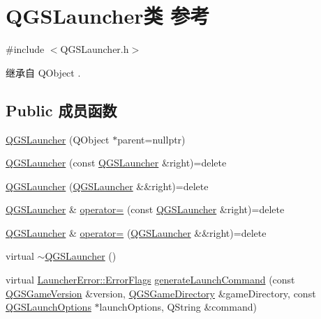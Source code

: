 \hypertarget{class_q_g_s_launcher}{}\section{Q\+G\+S\+Launcher类 参考}
\label{class_q_g_s_launcher}


{\ttfamily \#include $<$Q\+G\+S\+Launcher.\+h$>$}



继承自 Q\+Object .

\subsection*{Public 成员函数}
\begin{DoxyCompactItemize}
\item 
\mbox{\hyperlink{class_q_g_s_launcher_aec38bd177740a416eb524df87c2bc6c1}{Q\+G\+S\+Launcher}} (Q\+Object $\ast$parent=nullptr)
\item 
\mbox{\hyperlink{class_q_g_s_launcher_a714a15b491bbfc747304c4d18cbdfca2}{Q\+G\+S\+Launcher}} (const \mbox{\hyperlink{class_q_g_s_launcher}{Q\+G\+S\+Launcher}} \&right)=delete
\item 
\mbox{\hyperlink{class_q_g_s_launcher_a4b741495001fb70195d8d0d7fe4855ac}{Q\+G\+S\+Launcher}} (\mbox{\hyperlink{class_q_g_s_launcher}{Q\+G\+S\+Launcher}} \&\&right)=delete
\item 
\mbox{\hyperlink{class_q_g_s_launcher}{Q\+G\+S\+Launcher}} \& \mbox{\hyperlink{class_q_g_s_launcher_a09573b3f4dea862cf1e4811010230678}{operator=}} (const \mbox{\hyperlink{class_q_g_s_launcher}{Q\+G\+S\+Launcher}} \&right)=delete
\item 
\mbox{\hyperlink{class_q_g_s_launcher}{Q\+G\+S\+Launcher}} \& \mbox{\hyperlink{class_q_g_s_launcher_a83956014aa10c8de76706ca14ba4466d}{operator=}} (\mbox{\hyperlink{class_q_g_s_launcher}{Q\+G\+S\+Launcher}} \&\&right)=delete
\item 
virtual \mbox{\hyperlink{class_q_g_s_launcher_af7cf86d1477700c96475366b8232766d}{$\sim$\+Q\+G\+S\+Launcher}} ()
\item 
virtual \mbox{\hyperlink{namespace_launcher_error_ac3a8c0329368b890069c60ac80628085}{Launcher\+Error\+::\+Error\+Flags}} \mbox{\hyperlink{class_q_g_s_launcher_a56b1aaf3040498f81a00221cdddb75c0}{generate\+Launch\+Command}} (const \mbox{\hyperlink{class_q_g_s_game_version}{Q\+G\+S\+Game\+Version}} \&version, \mbox{\hyperlink{class_q_g_s_game_directory}{Q\+G\+S\+Game\+Directory}} \&game\+Directory, const \mbox{\hyperlink{class_q_g_s_launch_options}{Q\+G\+S\+Launch\+Options}} $\ast$launch\+Options, Q\+String \&command)
\end{DoxyCompactItemize}


